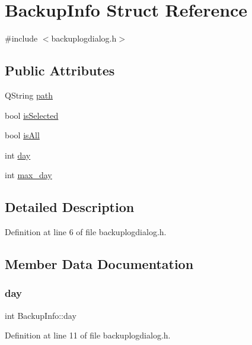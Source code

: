 \hypertarget{struct_backup_info}{}\section{Backup\+Info Struct Reference}
\label{struct_backup_info}


{\ttfamily \#include $<$backuplogdialog.\+h$>$}

\subsection*{Public Attributes}
\begin{DoxyCompactItemize}
\item 
Q\+String \mbox{\hyperlink{struct_backup_info_a0c821a66542387252d525ef6ca367dc0}{path}}
\item 
bool \mbox{\hyperlink{struct_backup_info_a44bd4711889aec5b8863e688b85d926b}{is\+Selected}}
\item 
bool \mbox{\hyperlink{struct_backup_info_a6ab70d40085ca41f65a2b6260b48b0a2}{is\+All}}
\item 
int \mbox{\hyperlink{struct_backup_info_a9d631c53f98aec6e6c0b0106bc9525f6}{day}}
\item 
int \mbox{\hyperlink{struct_backup_info_a57ebfab4744a979666451e9c94a24ac7}{max\+\_\+day}}
\end{DoxyCompactItemize}


\subsection{Detailed Description}


Definition at line 6 of file backuplogdialog.\+h.



\subsection{Member Data Documentation}
\mbox{\label{struct_backup_info_a9d631c53f98aec6e6c0b0106bc9525f6}} 
\subsubsection{\texorpdfstring{day}{day}}
{\footnotesize\ttfamily int Backup\+Info\+::day}



Definition at line 11 of file backuplogdialog.\+h.

